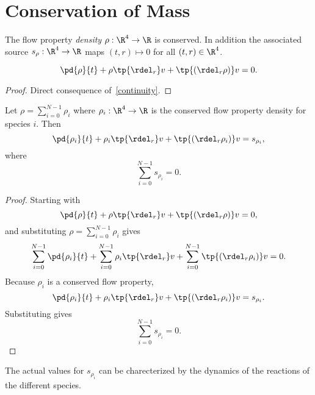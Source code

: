\section{Conservation of Mass}
\begin{df}[Density]
    The flow property \emph{density} $\rho:\R^4\to \R$ is conserved.
    In addition the associated source $s_\rho: \R^4 \to \R$ maps
    $(t,r)\mapsto 0$ for all $(t,r)\in \R^4$.
\end{df}
\begin{thm}
    \begin{equation}
    \label{conmass}
    \pd{\rho}{t} + \rho \tp{\rdel_r} v  +  \tp{(\rdel_r\rho )} v = 0.
    \end{equation}
\end{thm}
\begin{proof}
    Direct consequence of~\autoref{continuity}.
\end{proof}

\begin{thm}
    Let $\rho = \sum_{i=0}^{N-1} \rho_i$ where $\rho_i:\R^4\to \R$
    is the conserved flow property density for species $i$.  Then
    \begin{equation}
        \pd{\rho_i}{t} + \rho_i \tp{\rdel_r} v  +  \tp{(\rdel_r\rho_i )} v = s_{\rho_i},
    \end{equation}
    where
    \begin{equation}
        \sum_{i=0}^{N-1} s_{\rho_i} = 0.
    \end{equation}
\end{thm}
\begin{proof}
Starting with
    \begin{equation}
    \pd{\rho}{t} + \rho \tp{\rdel_r} v  +  \tp{(\rdel_r\rho )} v = 0,
    \end{equation}
    and substituting $\rho = \sum_{i=0}^{N-1} \rho_i$ gives
    \begin{equation}
        \sum_{i=0}^{N-1} \pd{\rho_i}{t} + \sum_{i=0}^{N-1} \rho_i \tp{\rdel_r} v  +  \sum_{i=0}^{N-1} \tp{(\rdel_r\rho_i )} v = 0.
    \end{equation}
    Because $\rho_i$ is a conserved flow property,
    \begin{equation}
        \pd{\rho_i}{t} + \rho_i \tp{\rdel_r} v  +  \tp{(\rdel_r\rho_i )} v = s_{\rho_i}.
    \end{equation}
    Substituting gives
    \begin{equation}
        \sum_{i=0}^{N-1} s_{\rho_i} = 0.
    \end{equation}
\end{proof}

\begin{rk}
The actual values for $s_{\rho_i}$ can be charecterized by the dynamics of the
reactions of the different species.
\end{rk}
